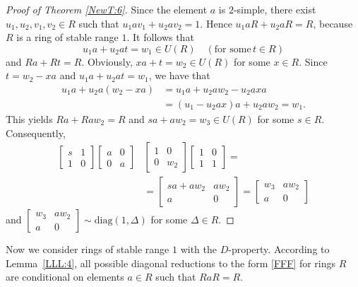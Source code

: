 \documentclass{cimart}
\begin{document}
\begin{proof}[Proof of Theorem \ref{NewT:6}]
 Since the element $a$ is $2$-simple, there exist $u_1, u_2, v_1, v_2 \in R$ such that $u_1 a v_1 + u_2 a v_2 = 1$. Hence
$u_1aR+u_2aR=R$, because  $R$ is a ring of  stable range $1$. It follows that
\[
u_1a+u_2at=w_1\in U(R) \quad (\text{for some} \, t\in R)
\]
and  $Ra+Rt=R$. Obviously,  $xa+t=w_2\in U(R)$ for some $x\in R$. Since  $t=w_2-xa$ and  $u_1a+u_2at=w_1$, we have that
\[
\begin{split}
u_1a+u_2 a(w_2-xa)&=u_1a+u_2aw_2-u_2axa\\&=(u_1-u_2ax)a+u_2aw_2=w_1.
\end{split}
\]
This yields  $Ra+Raw_2=R$ and $sa+aw_2=w_3\in U(R)$ for some $s\in R$. Consequently,
\[
\begin{split}
    \left[\begin{array}{cc}
      s & 1 \\
      1 & 0
    \end{array}\right]\left[\begin{array}{cc}
      a & 0 \\
      0 & a
    \end{array}\right]&\left[\begin{array}{cc}
      1 & 0 \\
      0 & w_2
    \end{array}\right]\left[\begin{array}{cc}
      1 & 0 \\
      1 & 1
    \end{array}\right]=\\&=\left[\begin{array}{cc}
      sa+aw_2 & aw_2 \\
      a & 0
    \end{array}\right]
    =\left[\begin{array}{cc}
      w_3 & aw_2\\
      a & 0
    \end{array}\right]
\end{split}
\]
and   $\left[\begin{array}{cc}
      w_3 & aw_2\\
      a & 0
\end{array}\right]\sim\mathrm{diag}(1,\Delta)$ for some $\Delta\in R$.
\end{proof}

Now  we consider  rings of  stable range $1$ with the $D$-property. According to Lemma~\ref{LLL:4},  all  possible diagonal reductions to the form \eqref{FFF} for rings $R$ are conditional  on elements $a\in R$ such that $RaR=R$.
\end{document}
